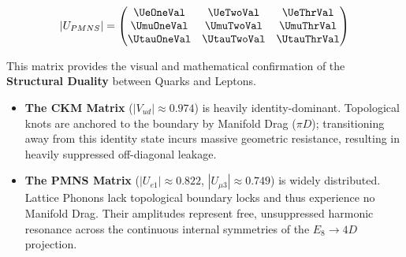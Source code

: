 \begin{equation}
|U_{PMNS}| =
\begin{pmatrix}
\mathbf{\UeOneVal} & \mathbf{\UeTwoVal} & \mathbf{\UeThrVal} \\
\mathbf{\UmuOneVal} & \mathbf{\UmuTwoVal} & \mathbf{\UmuThrVal} \\
\mathbf{\UtauOneVal} & \mathbf{\UtauTwoVal} & \mathbf{\UtauThrVal}
\end{pmatrix}
\end{equation}

This matrix provides the visual and mathematical confirmation of the \textbf{Structural Duality} between Quarks and Leptons. 
\begin{itemize}
    \item \textbf{The CKM Matrix} ($|V_{ud}| \approx 0.974$) is heavily identity-dominant. Topological knots are anchored to the boundary by Manifold Drag ($\pi D$); transitioning away from this identity state incurs massive geometric resistance, resulting in heavily suppressed off-diagonal leakage.
    \item \textbf{The PMNS Matrix} ($|U_{e1}| \approx 0.822$, $|U_{\mu3}| \approx 0.749$) is widely distributed. Lattice Phonons lack topological boundary locks and thus experience no Manifold Drag. Their amplitudes represent free, unsuppressed harmonic resonance across the continuous internal symmetries of the $E_8 \to 4D$ projection.
\end{itemize}